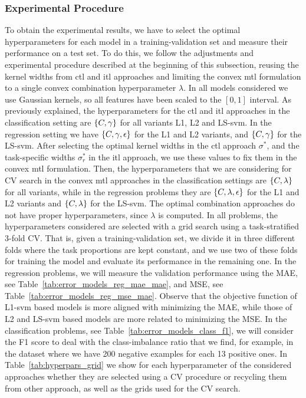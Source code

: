 \subsubsection*{Experimental Procedure}
To obtain the experimental results, we have to select the optimal hyperparameters for each model in a training-validation set and measure their performance on a test set. To do this, we follow the adjustments and experimental procedure described at the beginning of this subsection, reusing the kernel widths from \acrshort{ctl} and \acrshort{itl} approaches and limiting the convex \acrshort{mtl} formulation to a single convex combination hyperparameter $\lambda$.
%
In all models considered we use Gaussian kernels, so all features have been scaled to the $[0, 1]$ interval.
As previously explained, the hyperparameters for the \acrshort{ctl} and \acrshort{itl} approaches in the classification setting are $\left\{C, \gamma\right\}$ for all variants L1, L2 and LS-\acrshort{svm}.
In the regression setting we have $\left\{C, \gamma, \epsilon\right\}$ for the L1 and L2 variants, and $\left\{C, \gamma\right\}$ for the LS-\acrshort{svm}.
%
After selecting the optimal kernel widths in the \acrshort{ctl} approach $\sigma^*$, and the task-specific widths $\sigma_r^*$ in the \acrshort{itl} approach, we use these values to fix them in the convex \acrshort{mtl} formulation.
Then, the hyperparameters that we are considering for CV search in the convex \acrshort{mtl} approaches in the classification settings are $\left\{C, \lambda\right\}$ for all variants, while in the regression problems they are $\left\{C, \lambda, \epsilon\right\}$ for the L1 and L2 variants and $\left\{C, \lambda\right\}$ for the LS-\acrshort{svm}.
%
The optimal combination approaches do not have proper hyperparameters, since $\lambda$ is computed.
%
In all problems, the hyperparameters considered are selected with a grid search using a task-stratified $3$-fold CV. That is, given a training-validation set, we divide it in three different folds where the task proportions are kept constant, and we use two of these folds for training the model and evaluate its performance in the remaining one.
%
In the regression problems, we will measure the validation performance using the MAE, see Table~\ref{tab:error_models_reg_mae_mae}, and MSE, see Table~\ref{tab:error_models_reg_mse_mae}.  Observe that the objective function of L1-\acrshort{svm} based models is more aligned with minimizing the MAE, while those of L2 and LS-\acrshort{svm} based models are more related to minimizing the MSE.
In the classification problems, see Table~\ref{tab:error_models_class_f1}, we will consider the F1 score to deal with the class-imbalance ratio that we find, for example, in the  dataset where we have 200 negative examples for each 13 positive ones.
%
In Table~\ref{tab:hyperpars_grid} we show for each hyperparameter of the considered approaches whether they are selected using a CV procedure or recycling them from other approach, as well as the grids used for the CV search.

